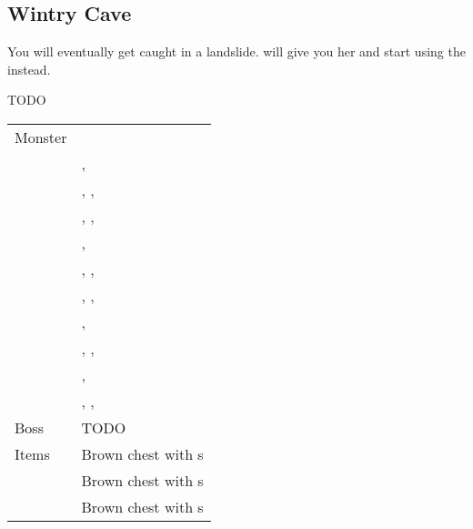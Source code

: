 \subsection{Wintry Cave}
\label{map:wintry_cave}

You will eventually get caught in a landslide.  will give you her  and start using the  instead.

TODO

\begin{longtable}{ l p{9cm} }
	Monster \\
	\nameref{monster:scorpion}
	& \nameref{monster:scorpion}, \nameref{monster:scorpion} \\
	& \nameref{monster:scorpion}, \nameref{monster:scorpion}, \nameref{monster:giant_toad} \\
	& \nameref{monster:scorpion}, \nameref{monster:scorpion}, \nameref{monster:scorpion} \\
	\nameref{monster:edgehog}
	& \nameref{monster:edgehog}, \nameref{monster:edgehog} \\
	& \nameref{monster:edgehog}, \nameref{monster:edgehog}, \nameref{monster:scorpion} \\
	& \nameref{monster:edgehog}, \nameref{monster:edgehog}, \nameref{monster:edgehog} \\
	\nameref{monster:land_worm}
	& \nameref{monster:land_worm}, \nameref{monster:land_worm} \\
	& \nameref{monster:land_worm}, \nameref{monster:land_worm}, \nameref{monster:edgehog} \\
	\nameref{monster:centaur}
	& \nameref{monster:centaur}, \nameref{monster:centaur} \\
	& \nameref{monster:centaur}, \nameref{monster:centaur}, \nameref{monster:land_worm} \\
	
	Boss & TODO \\
	Items
	& Brown chest with \nameref{weapon:bomb}s \\
	& Brown chest with \nameref{item:heal_potion}s \\
	& Brown chest with \nameref{item:refresher}s
\end{longtable}
